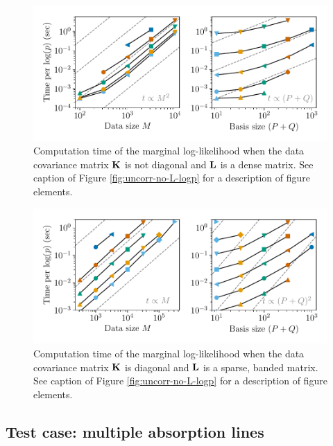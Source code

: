 \documentclass[manuscript]{aastex62}
\newcommand{\vx}[1]{{\bf {#1}}}
\begin{document}
\begin{figure}
  \includegraphics{corr_yes_L_scaling.pdf}
  \caption{Computation time of the marginal log-likelihood when the data covariance matrix $\vx{K}$ is not diagonal and $\vx{L}$ is a dense matrix. See caption of Figure \ref{fig:uncorr-no-L-logp} for a description of figure elements.}
  \label{fig:corr-yes-L-logp}
\end{figure}

\begin{figure}
  \includegraphics{uncorr_sparse_L_scaling.pdf}
  \caption{Computation time of the marginal log-likelihood when the data covariance matrix $\vx{K}$ is diagonal and $\vx{L}$ is a sparse, banded matrix. See caption of Figure \ref{fig:uncorr-no-L-logp} for a description of figure elements.}
  \label{fig:uncorr-sparse-L-logp}
\end{figure}


\subsection{Test case: multiple absorption lines}
\label{subsec:multiple-absorption-line-test-case}
\end{document}
